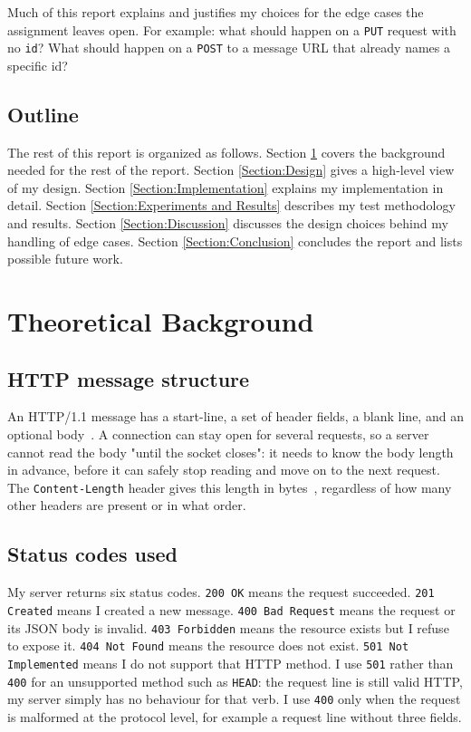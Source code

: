 \documentclass[conference]{IEEEtran}
\begin{document}
Much of this report explains and justifies my choices for the edge cases
the assignment leaves open. For example: what should happen on a
\texttt{PUT} request with no \texttt{id}? What should happen on a
\texttt{POST} to a message URL that already names a specific id?

\subsection{Outline}\label{Subsection:Outline}
The rest of this report is organized as follows. Section
\ref{Section:Theoretical Background} covers the background needed for the
rest of the report. Section \ref{Section:Design} gives a high-level view of
my design. Section \ref{Section:Implementation} explains my implementation
in detail. Section \ref{Section:Experiments and Results} describes my test
methodology and results. Section \ref{Section:Discussion} discusses the
design choices behind my handling of edge cases. Section
\ref{Section:Conclusion} concludes the report and lists possible future
work.


\section{Theoretical Background}\label{Section:Theoretical Background}

\subsection{HTTP message structure}\label{Subsection:http_structure}
An HTTP/1.1 message has a start-line, a set of header fields, a blank line,
and an optional body~\cite{rfc9112}. A connection can stay open for several
requests, so a server cannot read the body "until the socket closes": it
needs to know the body length in advance, before it can safely stop
reading and move on to the next request. The \texttt{Content-Length}
header gives this length in bytes~\cite{rfc9110}, regardless of how many
other headers are present or in what order.

\subsection{Status codes used}\label{Subsection:status_codes}
My server returns six status codes. \texttt{200 OK} means the request
succeeded. \texttt{201 Created} means I created a new message.
\texttt{400 Bad Request} means the request or its JSON body is invalid.
\texttt{403 Forbidden} means the resource exists but I refuse to expose it.
\texttt{404 Not Found} means the resource does not exist. \texttt{501 Not
Implemented} means I do not support that HTTP method. I use \texttt{501}
rather than \texttt{400} for an unsupported method such as \texttt{HEAD}:
the request line is still valid HTTP, my server simply has no behaviour
for that verb. I use \texttt{400} only when the request is malformed at
the protocol level, for example a request line without three fields.
\end{document}
